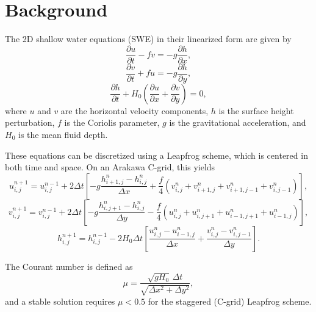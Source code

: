 \section{Background}

The 2D shallow water equations (SWE) in their linearized form are given by
\begin{equation}
\frac{\partial u}{\partial t} - f v = -g \frac{\partial h}{\partial x},
\end{equation}
\begin{equation}
\frac{\partial v}{\partial t} + f u = -g \frac{\partial h}{\partial y},
\end{equation}
\begin{equation}
\frac{\partial h}{\partial t} + H_0 \left( \frac{\partial u}{\partial x} + \frac{\partial v}{\partial y} \right) = 0,
\end{equation}
where $u$ and $v$ are the horizontal velocity components, $h$ is the surface height perturbation, $f$ is the Coriolis parameter, $g$ is the gravitational acceleration, and $H_0$ is the mean fluid depth.

These equations can be discretized using a Leapfrog scheme, which is centered in both time and space. On an Arakawa C-grid, this yields
\begin{equation}
u_{i,j}^{n+1} = u_{i,j}^{n-1} + 2\Delta t \left[
- g \frac{h_{i+1,j}^n - h_{i,j}^n}{\Delta x}
+ \frac{f}{4} \left( v_{i,j}^n + v_{i+1,j}^n + v_{i+1,j-1}^n + v_{i,j-1}^n \right)
\right],
\end{equation}
\begin{equation}
v_{i,j}^{n+1} = v_{i,j}^{n-1} + 2\Delta t \left[
- g \frac{h_{i,j+1}^n - h_{i,j}^n}{\Delta y}
- \frac{f}{4} \left( u_{i,j}^n + u_{i,j+1}^n + u_{i-1,j+1}^n + u_{i-1,j}^n \right)
\right],
\end{equation}
\begin{equation}
h_{i,j}^{n+1} = h_{i,j}^{n-1} - 2 H_0 \Delta t \left[
\frac{u_{i,j}^n - u_{i-1,j}^n}{\Delta x}
+ \frac{v_{i,j}^n - v_{i,j-1}^n}{\Delta y}
\right].
\end{equation}

The Courant number is defined as
\begin{equation}
\mu = \frac{\sqrt{g H_0}\,\Delta t}{\sqrt{\Delta x^2 + \Delta y^2}},
\end{equation}
and a stable solution requires $\mu < 0.5$ for the staggered (C-grid) Leapfrog scheme.


